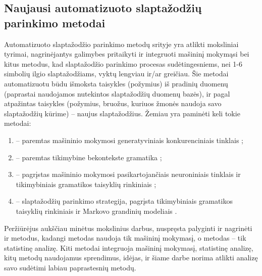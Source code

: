 \documentclass{VUMIFInfBakalaurinis}
\begin{document}
\subsection{Naujausi automatizuoto slaptažodžių parinkimo metodai}
Automatizuoto slaptažodžio parinkimo metodų srityje yra atlikti moksliniai 
tyrimai, nagrinėjantys galimybes pritaikyti ir integruoti mašininį mokymąsi bei 
kitus metodus, kad slaptažodžio parinkimo procesas sudėtingesniems, nei 1-6 
simbolių ilgio slaptažodžiams, vyktų lengviau ir/ar greičiau. Šie metodai 
automatizuotu būdu išmoksta taisykles (požymius) iš pradinių duomenų (paprastai 
naudojamos nutekintos slaptažodžių duomenų bazės), ir pagal atpažintas
taisykles (požymius, bruožus, kuriuos žmonės naudoja savo slaptažodžių kūrime) 
-- naujus slaptažodžius. Žemiau yra paminėti keli tokie metodai:
\begin{enumerate}
  \item {} -- paremtas mašininio mokymosi generatyviniais 
    konkurenciniais tinklais \cite{PassGAN};
  \item {} -- paremtas tikimybine bekontekste gramatika 
    \cite{PCFG1,PCFG2};
  \item {} -- pagrįstas mašininio mokymosi pasikartojančiais 
    neuroniniais tinklais ir tikimybiniais gramatikos taisyklių rinkiniais 
    \cite{GenPASS};
  \item {} -- slaptažodžių parinkimo strategija, pagrįsta 
    tikimybiniais gramatikos taisyklių rinkiniais ir Markovo grandinių modeliais 
    \cite{TG-SPSR}.
\end{enumerate}

Peržiūrėjus aukščiau minėtus mokslinius darbus, nuspręsta palyginti ir nagrinėti 
 ir  metodus, kadangi  
metodas naudoja tik mašininį mokymasį, o  metodas -- tik 
statistinę analizę. Kiti metodai integruoja mašininį mokymasį, statistinę 
analizę, kitų metodų naudojamus sprendimus, idėjas, ir šiame darbe norima 
atlikti analizę savo sudėtimi labiau paprastesnių metodų.


\end{document}
